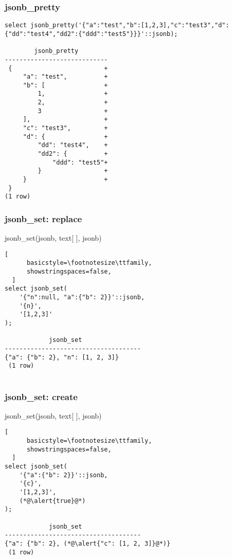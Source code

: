 \documentclass[14pt, compress]{beamer}
\begin{document}
\begin{frame}[fragile]
  \frametitle{jsonb\_pretty}

  \begin{lstlisting}[]
select jsonb_pretty('{"a":"test","b":[1,2,3],"c":"test3","d":{"dd":"test4","dd2":{"ddd":"test5"}}}'::jsonb);

        jsonb_pretty        
----------------------------
 {                         +
     "a": "test",          +
     "b": [                +
         1,                +
         2,                +
         3                 +
     ],                    +
     "c": "test3",         +
     "d": {                +
         "dd": "test4",    +
         "dd2": {          +
             "ddd": "test5"+
         }                 +
     }                     +
 }
(1 row)
  \end{lstlisting}

\end{frame}

\begin{frame}[fragile]
  \frametitle{jsonb\_set: replace}

  jsonb\_set(jsonb, text[ ], jsonb)

  \begin{lstlisting}[
      basicstyle=\footnotesize\ttfamily,
      showstringspaces=false,
  ]
select jsonb_set(
    '{"n":null, "a":{"b": 2}}'::jsonb,
    '{n}',
    '[1,2,3]'
);

            jsonb_set                                 
-------------------------------------
{"a": {"b": 2}, "n": [1, 2, 3]}
 (1 row)
 
  \end{lstlisting}

\end{frame}

\begin{frame}[fragile]
  \frametitle{jsonb\_set: create}
  jsonb\_set(jsonb, text[ ], jsonb)

  \begin{lstlisting}[
      basicstyle=\footnotesize\ttfamily,
      showstringspaces=false,
  ]
select jsonb_set(
    '{"a":{"b": 2}}'::jsonb,
    '{c}',
    '[1,2,3]',
    (*@\alert{true}@*)
);

            jsonb_set                                 
-------------------------------------
{"a": {"b": 2}, (*@\alert{"c": [1, 2, 3]}@*)}
 (1 row)
 
  \end{lstlisting}

\end{frame}
\end{document}
